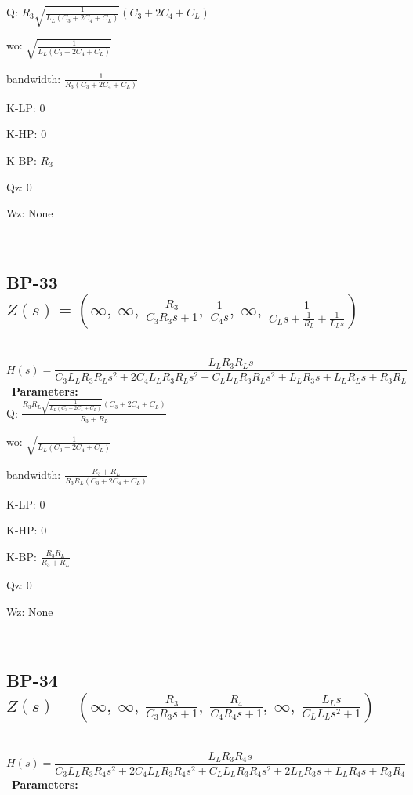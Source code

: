 \documentclass{article}
\begin{document}
Q: $R_{3} \sqrt{\frac{1}{L_{L} \left(C_{3} + 2 C_{4} + C_{L}\right)}} \left(C_{3} + 2 C_{4} + C_{L}\right)$\ 

wo: $\sqrt{\frac{1}{L_{L} \left(C_{3} + 2 C_{4} + C_{L}\right)}}$\ 

bandwidth: $\frac{1}{R_{3} \left(C_{3} + 2 C_{4} + C_{L}\right)}$\ 

K-LP: $0$\ 

K-HP: $0$\ 

K-BP: $R_{3}$\ 

Qz: $0$\ 

Wz: $\text{None}$\ 

\ 

\subsection{BP-33 $Z(s) = \left( \infty, \  \infty, \  \frac{R_{3}}{C_{3} R_{3} s + 1}, \  \frac{1}{C_{4} s}, \  \infty, \  \frac{1}{C_{L} s + \frac{1}{R_{L}} + \frac{1}{L_{L} s}}\right)$ } \ 
\textbf{\[H(s) = \frac{L_{L} R_{3} R_{L} s}{C_{3} L_{L} R_{3} R_{L} s^{2} + 2 C_{4} L_{L} R_{3} R_{L} s^{2} + C_{L} L_{L} R_{3} R_{L} s^{2} + L_{L} R_{3} s + L_{L} R_{L} s + R_{3} R_{L}}\] } \ 
\textbf{Parameters:}\\ 

Q: $\frac{R_{3} R_{L} \sqrt{\frac{1}{L_{L} \left(C_{3} + 2 C_{4} + C_{L}\right)}} \left(C_{3} + 2 C_{4} + C_{L}\right)}{R_{3} + R_{L}}$\ 

wo: $\sqrt{\frac{1}{L_{L} \left(C_{3} + 2 C_{4} + C_{L}\right)}}$\ 

bandwidth: $\frac{R_{3} + R_{L}}{R_{3} R_{L} \left(C_{3} + 2 C_{4} + C_{L}\right)}$\ 

K-LP: $0$\ 

K-HP: $0$\ 

K-BP: $\frac{R_{3} R_{L}}{R_{3} + R_{L}}$\ 

Qz: $0$\ 

Wz: $\text{None}$\ 

\ 

\subsection{BP-34 $Z(s) = \left( \infty, \  \infty, \  \frac{R_{3}}{C_{3} R_{3} s + 1}, \  \frac{R_{4}}{C_{4} R_{4} s + 1}, \  \infty, \  \frac{L_{L} s}{C_{L} L_{L} s^{2} + 1}\right)$ } \ 
\textbf{\[H(s) = \frac{L_{L} R_{3} R_{4} s}{C_{3} L_{L} R_{3} R_{4} s^{2} + 2 C_{4} L_{L} R_{3} R_{4} s^{2} + C_{L} L_{L} R_{3} R_{4} s^{2} + 2 L_{L} R_{3} s + L_{L} R_{4} s + R_{3} R_{4}}\] } \ 
\textbf{Parameters:}\\ 
\end{document}
